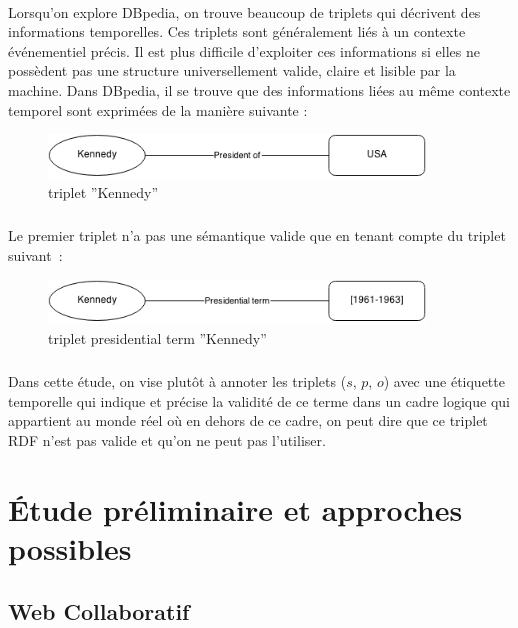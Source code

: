 \paragraph{}
Lorsqu’on explore DBpedia, on trouve beaucoup de triplets qui décrivent des informations temporelles. Ces triplets sont généralement liés à un contexte événementiel précis.
Il est plus difficile d’exploiter ces informations si elles ne possèdent pas une structure universellement valide, claire et lisible par la machine. Dans DBpedia, il se trouve que des informations liées au même contexte temporel sont exprimées de la manière suivante : 
\begin{figure}[H]
        \centering
                \centering
                \includegraphics[width=10cm]{ken.png}
               \caption{triplet ''Kennedy''}

\end{figure}
\subparagraph{}
Le premier triplet n'a pas une sémantique valide que en tenant compte du triplet suivant~: 
\begin{figure}[H]
        \centering
                \centering
                \includegraphics[width=10cm]{presidterm.png}
               \caption{triplet presidential term ''Kennedy''}

\end{figure}
\subparagraph{}
Dans cette étude, on vise plutôt à annoter les triplets ($s$, $p$, $o$) avec une étiquette temporelle qui indique et précise la validité de ce terme dans un cadre logique qui appartient au monde réel où en dehors de ce cadre, on peut dire que ce triplet RDF n’est pas valide et qu’on ne peut pas l’utiliser.

\section{Étude préliminaire et approches possibles}
\subsection{Web Collaboratif}
